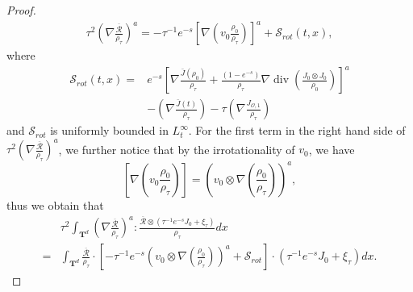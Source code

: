 \documentclass[english]{amsart}
\theoremstyle{plain}
\theoremstyle{definition}
\theoremstyle{remark}
\theoremstyle{plain}
\theoremstyle{plain}
\theoremstyle{plain}
\def\T{{\mathbf T}}%
\DeclareMathOperator{\diver}{div}
\numberwithin{equation}{section}
\begin{document}
\begin{proof}
\begin{align*}
\tau^2 \left(\nabla\frac{\overline{\mathcal{R}}}{\rho_\tau}\right)^a
=-\tau^{-1} e^{-s}\left[\nabla\left(v_0\frac{\rho_0}{\rho_\tau}\right)\right]^a+\mathcal{S}_{rot}(t,x),
\end{align*}
where 
\begin{equation}\label{eq:S_curl}
\begin{aligned}
\mathcal{S}_{rot}(t,x)=&e^{-s}\left[\nabla\frac{\bar J(\rho_0)}{\rho_\tau}+\frac{(1-e^{-s})}{\rho_\tau}\nabla\diver\left(\frac{J_0\otimes J_0}{\rho_0}\right)\right]^a\\
&-\left(\nabla\frac{\bar J(t)}{\rho_\tau}\right)-\tau \left(\nabla\frac{J_{\mathcal{O},1}}{\rho_\tau}\right)
\end{aligned}
\end{equation}
and $\mathcal{S}_{rot}$ is uniformly bounded in $L^\infty_t$. For the first term in the right hand side of $\tau^2 \left(\nabla\frac{\overline{\mathcal{R}}}{\rho_\tau}\right)^a$, we further notice that by the irrotationality of $v_0$, we have
\[
\left[\nabla\left(v_0\frac{\rho_0}{\rho_\tau}\right)\right]=\left(v_0\otimes\nabla\left(\frac{\rho_0}{\rho_\tau}\right)\right)^a,
\]
thus we obtain that
\begin{align*}
&\tau^2\int_{\T^d} \left(\nabla\frac{\overline{\mathcal{R}}}{\rho_\tau}\right)^a:\frac{\overline{\mathcal{R}}\otimes(\tau^{-1}e^{-s}J_0+\xi_\tau)}{\rho_\tau}dx\\
=&\int_{\T^d}\frac{\overline{\mathcal{R}}}{\rho_\tau}\cdot\left[-\tau^{-1} e^{-s}\left(v_0\otimes\nabla\left(\frac{\rho_0}{\rho_\tau}\right)\right)^a+\mathcal{S}_{rot}\right]\cdot(\tau^{-1}e^{-s}J_0+\xi_\tau)dx.
\end{align*}



\end{proof}
\end{document}
